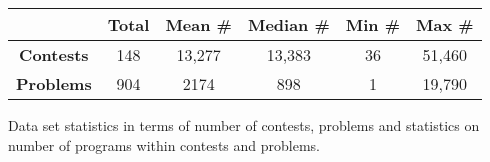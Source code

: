 \begingroup
\setlength{\tabcolsep}{8pt} %
\renewcommand{\arraystretch}{1.6} %
\begin{tabular}{c|ccccc}
  & \textbf{Total} & \textbf{Mean \#} & \textbf{Median \#} & \textbf{Min \#} & \textbf{Max \#} \\ \hline
\textbf{Contests} & 148 & 13,277 & 13,383 & 36 & 51,460 \\
\textbf{Problems} & 904 & 2174 & 898 & 1 & 19,790 \\
\end{tabular}
\caption[Data set statistics]{Data set statistics in terms of number of contests, problems and statistics on number of programs within contests and problems.}